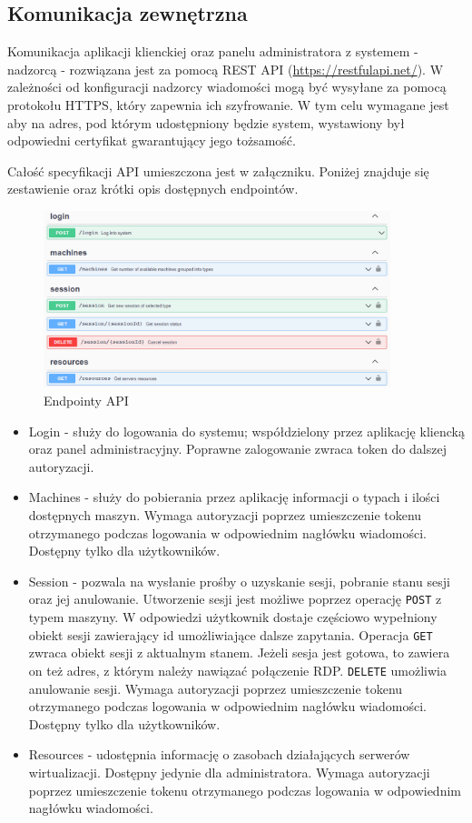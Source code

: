 \documentclass[../opis-rozwiazania.tex]{subfiles}
\begin{document}
\subsection{Komunikacja zewnętrzna}
\label{communication:api}
Komunikacja aplikacji klienckiej oraz panelu administratora z systemem - nadzorcą - rozwiązana jest za pomocą REST API (\url{https://restfulapi.net/}). W zależności od konfiguracji nadzorcy wiadomości mogą być wysyłane za pomocą protokołu HTTPS, który zapewnia ich szyfrowanie. W tym celu wymagane jest aby na adres, pod którym udostępniony będzie system, wystawiony był odpowiedni certyfikat \parencite{ssl-cert} gwarantujący jego tożsamość.

Całość specyfikacji API umieszczona jest w załączniku. Poniżej znajduje się zestawienie oraz krótki opis dostępnych endpointów.

\begin{figure}[H]
  \centering
  \includegraphics[width=0.9\textwidth]{../api/endpoints.png}
  \caption{Endpointy API}
\end{figure}

\begin{itemize}
  \item Login - służy do logowania do systemu; współdzielony przez aplikację kliencką oraz panel administracyjny. Poprawne zalogowanie zwraca token do dalszej autoryzacji.
  \item Machines - służy do pobierania przez aplikację informacji o typach i ilości dostępnych maszyn. Wymaga autoryzacji poprzez umieszczenie tokenu otrzymanego podczas logowania w odpowiednim nagłówku wiadomości. Dostępny tylko dla użytkowników.
  \item Session - pozwala na wysłanie prośby o uzyskanie sesji, pobranie stanu sesji oraz jej anulowanie. Utworzenie sesji jest możliwe poprzez operację \texttt{POST} z typem maszyny. W odpowiedzi użytkownik dostaje częściowo wypełniony obiekt sesji zawierający id umożliwiające dalsze zapytania. Operacja \texttt{GET} zwraca obiekt sesji z aktualnym stanem. Jeżeli sesja jest gotowa, to zawiera on też adres, z którym należy nawiązać połączenie RDP. \texttt{DELETE} umożliwia anulowanie sesji. Wymaga autoryzacji poprzez umieszczenie tokenu otrzymanego podczas logowania w odpowiednim nagłówku wiadomości. Dostępny tylko dla użytkowników.
  \item Resources - udostępnia informację o zasobach działających serwerów wirtualizacji. Dostępny jedynie dla administratora. Wymaga autoryzacji poprzez umieszczenie tokenu otrzymanego podczas logowania w odpowiednim nagłówku wiadomości.
\end{itemize}
\end{document}
